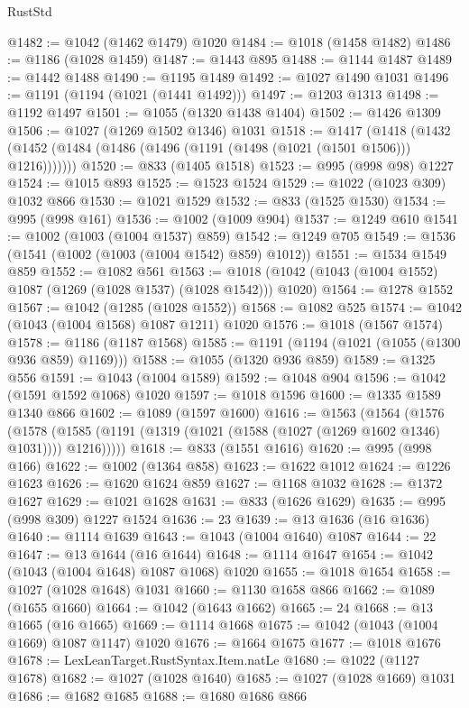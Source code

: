 \begin{lexlean}{RustStd}
\begin{coremodule}
{\begin{coremodule}
{{{{{{{{{{{{{{{{{{{{{{{{{{@1482 := @1042 (@1462 @1479) @1020
@1484 := @1018 (@1458 @1482)
@1486 := @1186 (@1028 @1459)
@1487 := @1443 @895
@1488 := @1144 @1487
@1489 := @1442 @1488
@1490 := @1195 @1489
@1492 := @1027 @1490 @1031
@1496 := @1191 (@1194 (@1021 (@1441 @1492)))
@1497 := @1203 @1313
@1498 := @1192 @1497
@1501 := @1055 (@1320 @1438 @1404)
@1502 := @1426 @1309
@1506 := @1027 (@1269 @1502 @1346) @1031
@1518 := @1417
    (@1418 (@1432 (@1452 (@1484 (@1486 (@1496 (@1191 (@1498 (@1021 (@1501 @1506))) @1216)))))))
@1520 := @833 (@1405 @1518)
@1523 := @995 (@998 @98) @1227
@1524 := @1015 @893
@1525 := @1523 @1524
@1529 := @1022 (@1023 @309) @1032 @866
@1530 := @1021 @1529
@1532 := @833 (@1525 @1530)
@1534 := @995 (@998 @161)
@1536 := @1002 (@1009 @904)
@1537 := @1249 @610
@1541 := @1002 (@1003 (@1004 @1537) @859)
@1542 := @1249 @705
@1549 := @1536 (@1541 (@1002 (@1003 (@1004 @1542) @859) @1012))
@1551 := @1534 @1549 @859
@1552 := @1082 @561
@1563 := @1018 (@1042 (@1043 (@1004 @1552) @1087 (@1269 (@1028 @1537) (@1028 @1542))) @1020)
@1564 := @1278 @1552
@1567 := @1042 (@1285 (@1028 @1552))
@1568 := @1082 @525
@1574 := @1042 (@1043 (@1004 @1568) @1087 @1211) @1020
@1576 := @1018 (@1567 @1574)
@1578 := @1186 (@1187 @1568)
@1585 := @1191 (@1194 (@1021 (@1055 (@1300 @936 @859) @1169)))
@1588 := @1055 (@1320 @936 @859)
@1589 := @1325 @556
@1591 := @1043 (@1004 @1589)
@1592 := @1048 @904
@1596 := @1042 (@1591 @1592 @1068) @1020
@1597 := @1018 @1596
@1600 := @1335 @1589 @1340 @866
@1602 := @1089 (@1597 @1600)
@1616 := @1563
    (@1564
      (@1576
        (@1578 (@1585 (@1191 (@1319 (@1021 (@1588 (@1027 (@1269 @1602 @1346) @1031)))) @1216)))))
@1618 := @833 (@1551 @1616)
@1620 := @995 (@998 @166)
@1622 := @1002 (@1364 @858)
@1623 := @1622 @1012
@1624 := @1226 @1623
@1626 := @1620 @1624 @859
@1627 := @1168 @1032
@1628 := @1372 @1627
@1629 := @1021 @1628
@1631 := @833 (@1626 @1629)
@1635 := @995 (@998 @309) @1227 @1524
@1636 := 23
@1639 := @13 @1636 (@16 @1636)
@1640 := @1114 @1639
@1643 := @1043 (@1004 @1640) @1087
@1644 := 22
@1647 := @13 @1644 (@16 @1644)
@1648 := @1114 @1647
@1654 := @1042 (@1043 (@1004 @1648) @1087 @1068) @1020
@1655 := @1018 @1654
@1658 := @1027 (@1028 @1648) @1031
@1660 := @1130 @1658 @866
@1662 := @1089 (@1655 @1660)
@1664 := @1042 (@1643 @1662)
@1665 := 24
@1668 := @13 @1665 (@16 @1665)
@1669 := @1114 @1668
@1675 := @1042 (@1043 (@1004 @1669) @1087 @1147) @1020
@1676 := @1664 @1675
@1677 := @1018 @1676
@1678 := LexLeanTarget.RustSyntax.Item.natLe
@1680 := @1022 (@1127 @1678)
@1682 := @1027 (@1028 @1640)
@1685 := @1027 (@1028 @1669) @1031
@1686 := @1682 @1685
@1688 := @1680 @1686 @866
}}}}}}}}}}}}}}}}}}}}}}}}}}
\end{coremodule}}
\end{coremodule}
\end{lexlean}
